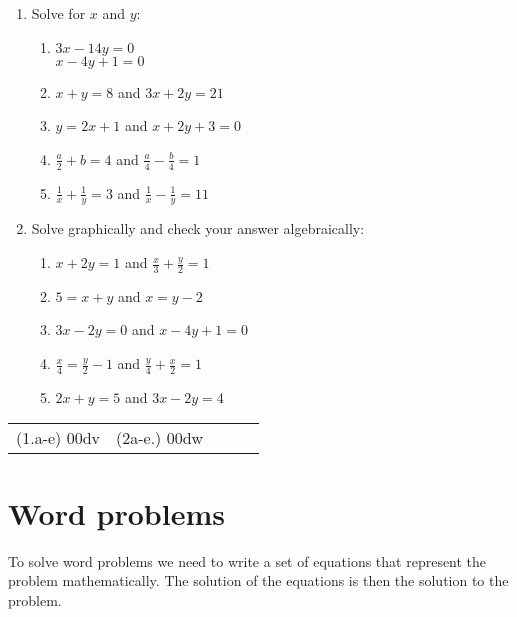 \begin{exercises}{}
{
\begin{enumerate}[noitemsep, label=\textbf{\arabic*}. ] 
\item Solve for $x$ and $y$: 
\begin{enumerate}[noitemsep, label=\textbf{(\alph*)} ] 
\item $3x-14y=0$ \\ $x-4y+1=0$
\item $x+y=8$ and $3x + 2y = 21$
\item $y=2x+1$ and $x + 2y + 3 = 0$
\item $\frac{a}{2}+b=4$ and $\frac{a}{4} -\frac{b}{4}=1$
\item $\frac{1}{x}+\frac{1}{y}=3$ and $\frac{1}{x}-\frac{1}{y}=11$
\end{enumerate}

\item Solve graphically and check your answer algebraically:

\begin{enumerate}[noitemsep, label=\textbf{(\alph*)} ] 

\item  $x+2y=1$ and $\frac{x}{3} + \frac{y}{2} = 1$
\item $5= x+y$ and $x = y-2$
\item $3x - 2y = 0$ and $x - 4y + 1 = 0$
\item $\frac{x}{4}=\frac{y}{2}-1$  and $\frac{y}{4}+\frac{x}{2}=1$
\item $2x+y=5$ and $3x-2y=4$
\end{enumerate}
\end{enumerate}
\practiceinfo
\par 
\par \begin{tabular}[h]{ccccc}
(1.a-e) 00dv&  (2a-e.) 00dw & \end{tabular}
}
\end{exercises}

\section{Word problems}

To solve word problems we need to write a set of equations that represent the problem mathematically. 
The solution of the equations is then the solution to the problem.

